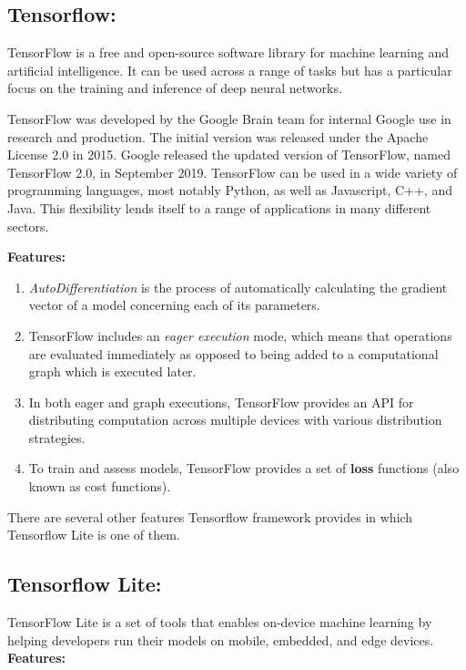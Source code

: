 \subsection{Tensorflow:}

TensorFlow is a free and open-source software library for machine learning and artificial intelligence. It can be used across a range of tasks but has a particular focus on the training and inference of deep neural networks.

TensorFlow was developed by the Google Brain team for internal Google use in research and production. The initial version was released under the Apache License 2.0 in 2015. Google released the updated version of TensorFlow, named TensorFlow 2.0, in September 2019. TensorFlow can be used in a wide variety of programming languages, most notably Python, as well as Javascript, C++, and Java. This flexibility lends itself to a range of applications in many different sectors.

\textbf{Features:}

\begin{enumerate}
  \item \textit{AutoDifferentiation} is the process of automatically calculating the gradient vector of a model concerning each of its parameters. 
  \item TensorFlow includes an \textit{eager execution} mode, which means that operations are evaluated immediately as opposed to being added to a computational graph which is executed later.
  \item In both eager and graph executions, TensorFlow provides an API for distributing computation across multiple devices with various distribution strategies. 
  \item To train and assess models, TensorFlow provides a set of \textbf{loss} functions (also known as cost functions).
\end{enumerate}

There are several other features Tensorflow framework provides in which Tensorflow Lite is one of them. 

\subsection{Tensorflow Lite:}
TensorFlow Lite is a set of tools that enables on-device machine learning by helping developers run their models on mobile, embedded, and edge devices.
\break\break
\textbf{Features:} 

